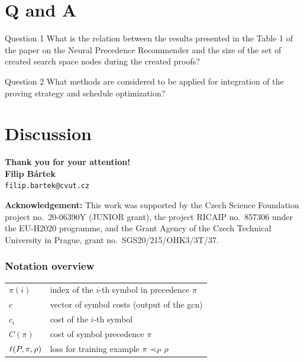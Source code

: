 \documentclass[a4paper]{beamer}
\makeatletter
\newcommand\Email{filip.bartek@cvut.cz}
\makeatother
\begin{document}
\section{Q and A}

\begin{frame}{Question 1}
What is the relation between the results presented in the Table 1 of the paper on the Neural Precedence Recommender and the size of the set of created search space nodes during the created proofs?
\end{frame}

\begin{frame}{Question 2}
What methods are considered to be applied for integration of the proving strategy and schedule optimization?
\end{frame}

\section*{Discussion}
\begin{frame}
\begin{center}
\vspace*{1cm}
{\bf Thank you for your attention!}\\
\vspace*{2cm}
{\bf\Large Filip Bártek}\\
{\tt \Email}
\vspace*{1cm}
\end{center}

\vfill
{\tiny {\bf Acknowledgement:} This work was supported by
the Czech Science Foundation project no.~20-06390Y (JUNIOR grant),
the project RICAIP no.~857306 under the EU-H2020 programme,
and
the Grant Agency of the Czech Technical University in Prague, grant
no.~SGS20/215/OHK3/3T/37.\par}
\end{frame}
%
\appendix

\begin{frame}
\frametitle{Notation overview}
\begin{center}
\begin{tabular}{ll}
$\pi(i)$ & index of the $i$-th symbol in precedence $\pi$ \\
$c$ & vector of symbol costs (output of the \acrshort{gcn}) \\
$c_i$ & cost of the $i$-th symbol \\
$C(\pi)$ & cost of symbol precedence $\pi$ \\
$\ell(P, \pi, \rho)$ & loss for training example $\pi \prec_{P} \rho$ \\
\end{tabular}
\end{center}
\end{frame}
\end{document}
